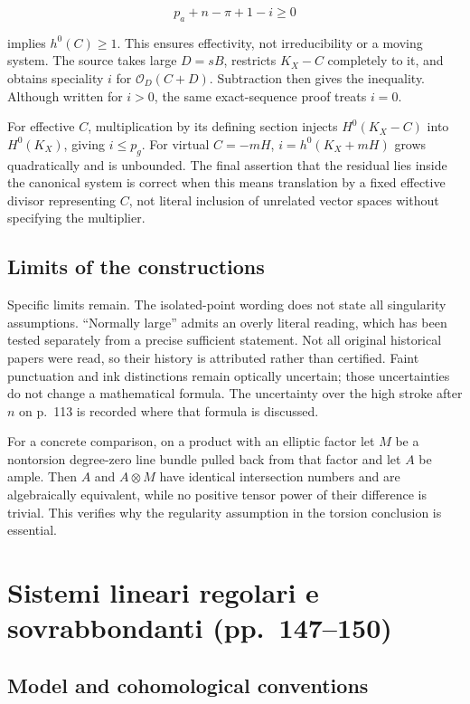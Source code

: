 \[
p_a+n-\pi+1-i\ge0
\]

implies \(h^0(C)\ge1\). This ensures effectivity, not irreducibility or a moving system. The source takes large \(D=sB\), restricts \(K_X-C\) completely to it, and obtains speciality \(i\) for \(\mathcal O_D(C+D)\). Subtraction then gives the inequality. Although written for \(i>0\), the same exact-sequence proof treats \(i=0\).

For effective \(C\), multiplication by its defining section injects \(H^0(K_X-C)\) into \(H^0(K_X)\), giving \(i\le p_g\). For virtual \(C=-mH\), \(i=h^0(K_X+mH)\) grows quadratically and is unbounded. The final assertion that the residual lies inside the canonical system is correct when this means translation by a fixed effective divisor representing \(C\), not literal inclusion of unrelated vector spaces without specifying the multiplier.

\subsection{Limits of the constructions}

Specific limits remain. The isolated-point wording does not state all singularity assumptions. ``Normally large'' admits an overly literal reading, which has been tested separately from a precise sufficient statement. Not all original historical papers were read, so their history is attributed rather than certified. Faint punctuation and ink distinctions remain optically uncertain; those uncertainties do not change a mathematical formula. The uncertainty over the high stroke after \(n\) on p.~113 is recorded where that formula is discussed.

For a concrete comparison, on a product with an elliptic factor let \(M\) be a nontorsion degree-zero line bundle pulled back from that factor and let \(A\) be ample. Then \(A\) and \(A\otimes M\) have identical intersection numbers and are algebraically equivalent, while no positive tensor power of their difference is trivial. This verifies why the regularity assumption in the torsion conclusion is essential.

\section[Sistemi regolari e sovrabbondanti]{Sistemi lineari regolari e sovrabbondanti (pp.~147--150)}\label{enriques-iv-15}

\subsection{Model and cohomological conventions}

